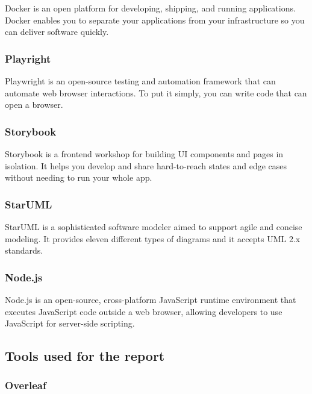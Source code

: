 Docker is an open platform for developing, shipping, and running applications. Docker enables you to separate your applications from your infrastructure so you can deliver software quickly.

\subsubsection*{\protect{} Playright}

Playwright is an open-source testing and automation framework that can automate web browser interactions. To put it simply, you can write code that can open a browser.

\subsubsection*{\protect{} Storybook}

Storybook is a frontend workshop for building UI components and pages in isolation. It helps you develop and share hard-to-reach states and edge cases without needing to run your whole app.

\subsubsection*{\protect{} StarUML}

StarUML is a sophisticated software modeler aimed to support agile and concise modeling. It provides eleven different types of diagrams and it accepts UML 2.x standards.

\subsubsection*{\protect{} Node.js}

Node.js is an open-source, cross-platform JavaScript runtime environment that executes JavaScript code outside a web browser, allowing developers to use JavaScript for server-side scripting.


\subsection{Tools used for the report}

\subsubsection*{\protect{} Overleaf}

